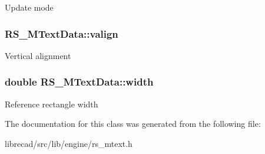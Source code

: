 Update mode \hypertarget{classRS__MTextData_ac31d2023d1a931c657d458f86a7ded60}{
\subsubsection[{valign}]{ R\-S\-\_\-\-M\-Text\-Data\-::valign}}\label{classRS__MTextData_ac31d2023d1a931c657d458f86a7ded60}
Vertical alignment \hypertarget{classRS__MTextData_ad0be22729fac2b25845dcc5a67dde87b}{
\subsubsection[{width}]{\setlength{\rightskip}{0pt plus 5cm}double R\-S\-\_\-\-M\-Text\-Data\-::width}}\label{classRS__MTextData_ad0be22729fac2b25845dcc5a67dde87b}
Reference rectangle width 

The documentation for this class was generated from the following file\-:\begin{DoxyCompactItemize}
\item 
librecad/src/lib/engine/rs\-\_\-mtext.\-h\end{DoxyCompactItemize}
